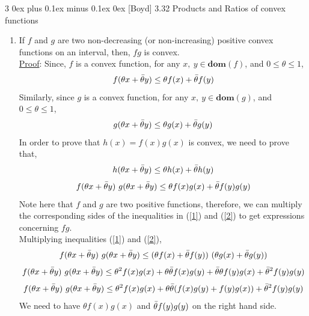 \documentclass[12pt, draftcls, onecolumn]{IEEEtran}
\makeatletter
\def\subsubsection{\@startsection{subsubsection}%
                                 {3}%
                                 {\z@}%
                                 {0ex plus 0.1ex minus 0.1ex}%
                                 {0ex}%
                                 {\normalfont\normalsize\bfseries}}%
\makeatother
\begin{document}
\subsubsection{[Boyd] 3.32}
Products and Ratios of convex functions
\begin{enumerate}
    \item If $f$ and $g$ are two non-decreasing (or non-increasing) positive convex functions on an interval, then, $fg$ is convex.
    \\\underline{Proof}:
    Since, $f$ is a convex function, for any $x,\ y \in \textbf{dom}(f)$, and $0 \leq \theta \leq 1$,
    \begin{equation}\label{1}
        f(\theta x+\Bar{\theta} y) \leq \theta f(x) + \Bar{\theta} f(y)
    \end{equation}
    Similarly, since $g$ is a convex function, for any $x,\ y \in \textbf{dom}(g)$, and $0 \leq \theta \leq 1$,
    \begin{equation}\label{2}
        g(\theta x+\Bar{\theta} y) \leq \theta g(x) + \Bar{\theta} g(y)
    \end{equation}
    In order to prove that $h(x) = f(x)g(x)$ is convex, we need to prove that,
    \[h(\theta x + \Bar{\theta} y) \leq \theta h(x) + \Bar{\theta} h(y)\]
    \[f(\theta x + \Bar{\theta} y)\ g(\theta x + \Bar{\theta} y) \leq \theta f(x)g(x) + \Bar{\theta} f(y)g(y)\]
    Note here that $f$ and $g$ are two positive functions, therefore, we can multiply the corresponding sides of the inequalities in (\ref{1}) and (\ref{2}) to get expressions concerning $fg$.
    \\Multiplying inequalities (\ref{1}) and (\ref{2}),
    \begin{equation}\label{3}
        f(\theta x+\Bar{\theta} y)\ g(\theta x+\Bar{\theta} y) \leq (\theta f(x) + \Bar{\theta} f(y))\ (\theta g(x) + \Bar{\theta} g(y))
    \end{equation}
    \begin{equation*}
        f(\theta x+\Bar{\theta} y)\ g(\theta x+\Bar{\theta} y) \leq \theta^2 f(x)g(x) + \theta \Bar{\theta} f(x)g(y) + \Bar{\theta} \theta f(y)g(x) + \Bar{\theta}^2 f(y)g(y)
    \end{equation*}
    \begin{equation*}
        f(\theta x+\Bar{\theta} y)\ g(\theta x+\Bar{\theta} y) \leq \theta^2 f(x)g(x) + \theta \Bar{\theta} (f(x)g(y) + f(y)g(x)) + \Bar{\theta}^2 f(y)g(y)
    \end{equation*}
    We need to have $\theta f(x)g(x)$ and $\Bar{\theta} f(y)g(y)$ on the right hand side.

\end{enumerate}
\end{document}
